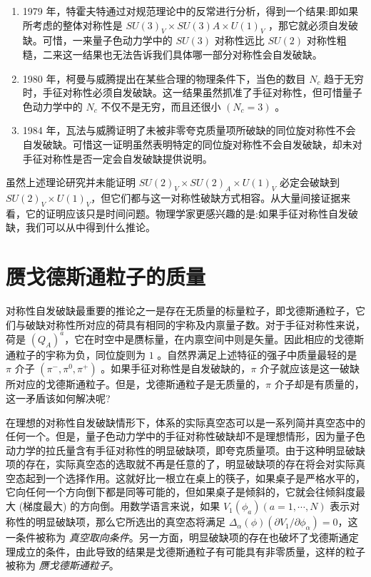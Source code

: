 \documentclass[oneside,a4paper,openany,11pt]{ctexbook}
\begin{document}
\begin{enumerate}
    \item 1979 年，特霍夫特通过对规范理论中的反常进行分析，得到一个结果:即如果所考虑的整体对称性是 $SU(3)_V \times S U (3) A \times U(1)_V$ ，那它就必须自发破缺。可惜，一来量子色动力学中的 $SU(3)$ 对称性远比 $SU(2)$ 对称性粗糙，二来这一结果也无法告诉我们具体哪一部分对称性会自发破缺。
    \item 1980 年，柯曼与威腾提出在某些合理的物理条件下，当色的数目 $N_c$ 趋于无穷时，手征对称性必须自发破缺。这一结果虽然抓准了手征对称性，但可惜量子色动力学中的 $N_c$ 不仅不是无穷，而且还很小 $(N_c=3)$ 。
    \item 1984 年，瓦法与威腾证明了未被非零夸克质量项所破缺的同位旋对称性不会自发破缺。可惜这一证明虽然表明特定的同位旋对称性不会自发破缺，却未对手征对称性是否一定会自发破缺提供说明。
\end{enumerate}

虽然上述理论研究并未能证明 $SU(2)_V \times SU(2)_A \times U(1)_V$ 必定会破缺到 $SU(2)_V \times U(1)_V$，但它们都与这一对称性破缺方式相容。从大量间接证据来看，它的证明应该只是时间问题。物理学家更感兴趣的是:如果手征对称性自发破缺，我们可以从中得到什么推论。

\section{赝戈德斯通粒子的质量}

对称性自发破缺最重要的推论之一是存在无质量的标量粒子，即戈德斯通粒子，它们与破缺对称性所对应的荷具有相同的宇称及内禀量子数。对于手征对称性来说，荷是 $(Q_A)^a$，它在时空中是赝标量，在内禀空间中则是矢量。因此相应的戈德斯通粒子的宇称为负，同位旋则为 $1$ 。自然界满足上述特征的强子中质量最轻的是 $\pi$ 介子 $(\pi^-, \pi^0, \pi^+)$ 。如果手征对称性是自发破缺的，$\pi$ 介子就应该是这一破缺所对应的戈德斯通粒子。但是，戈德斯通粒子是无质量的，$\pi$ 介子却是有质量的，这一矛盾该如何解决呢?

在理想的对称性自发破缺情形下，体系的实际真空态可以是一系列简并真空态中的任何一个。但是，量子色动力学中的手征对称性破缺却不是理想情形，因为量子色动力学的拉氏量含有手征对称性的明显破缺项，即夸克质量项。由于这种明显破缺项的存在，实际真空态的选取就不再是任意的了，明显破缺项的存在将会对实际真空态起到一个选择作用。这就好比一根立在桌上的筷子，如果桌子是严格水平的，它向任何一个方向倒下都是同等可能的，但如果桌子是倾斜的，它就会往倾斜度最大 (梯度最大) 的方向倒。用数学语言来说，如果 $V_1(\phi_a) (a=1, \cdots, N)$ 表示对称性的明显破缺项，那么它所选出的真空态将满足 $\Delta_\alpha(\phi) (\partial V_1/\partial \phi_\alpha)=0$，这一条件被称为 \emph{真空取向条件}。另一方面，明显破缺项的存在也破坏了戈德斯通定理成立的条件，由此导致的结果是戈德斯通粒子有可能具有非零质量，这样的粒子被称为 \emph{赝戈德斯通粒子}。
\end{document}
